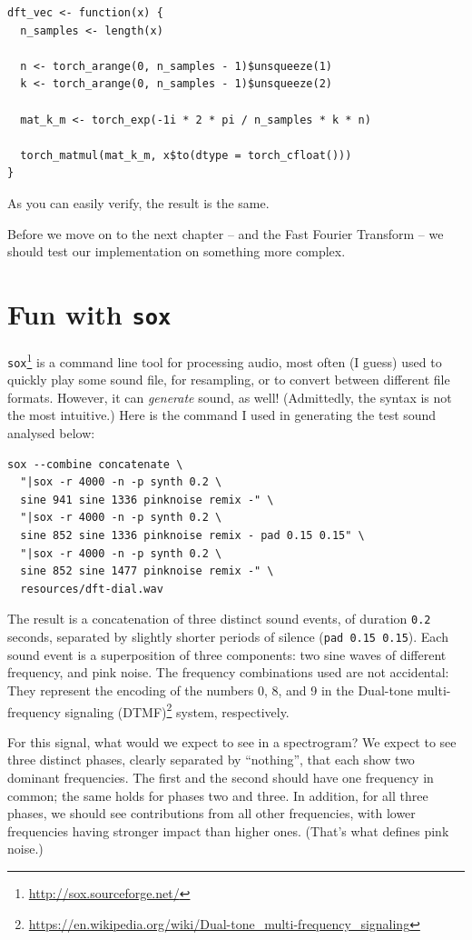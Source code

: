 \documentclass[
  letterpaper,
]{krantz}
\DeclareRobustCommand{\href}[2]{#2\footnote{\url{#1}}}
\begin{document}
\begin{verbatim}
dft_vec <- function(x) {
  n_samples <- length(x)

  n <- torch_arange(0, n_samples - 1)$unsqueeze(1)
  k <- torch_arange(0, n_samples - 1)$unsqueeze(2)

  mat_k_m <- torch_exp(-1i * 2 * pi / n_samples * k * n)

  torch_matmul(mat_k_m, x$to(dtype = torch_cfloat()))
}
\end{verbatim}

As you can easily verify, the result is the same.

Before we move on to the next chapter -- and the Fast Fourier Transform
-- we should test our implementation on something more complex.

\hypertarget{fun-with-sox}{%
\section{\texorpdfstring{Fun with
\texttt{sox}}{Fun with sox}}\label{fun-with-sox}}

\href{http://sox.sourceforge.net/}{\texttt{sox}} is a command line tool
for processing audio, most often (I guess) used to quickly play some
sound file, for resampling, or to convert between different file
formats. However, it can \emph{generate} sound, as well! (Admittedly,
the syntax is not the most intuitive.) Here is the command I used in
generating the test sound analysed below:

\begin{verbatim}
sox --combine concatenate \
  "|sox -r 4000 -n -p synth 0.2 \
  sine 941 sine 1336 pinknoise remix -" \
  "|sox -r 4000 -n -p synth 0.2 \
  sine 852 sine 1336 pinknoise remix - pad 0.15 0.15" \
  "|sox -r 4000 -n -p synth 0.2 \
  sine 852 sine 1477 pinknoise remix -" \
  resources/dft-dial.wav
\end{verbatim}

The result is a concatenation of three distinct sound events, of
duration \texttt{0.2} seconds, separated by slightly shorter periods of
silence (\texttt{pad\ 0.15\ 0.15}). Each sound event is a superposition
of three components: two sine waves of different frequency, and pink
noise. The frequency combinations used are not accidental: They
represent the encoding of the numbers 0, 8, and 9 in the
\href{https://en.wikipedia.org/wiki/Dual-tone_multi-frequency_signaling}{Dual-tone
multi-frequency signaling (DTMF)} system, respectively.

For this signal, what would we expect to see in a spectrogram? We expect
to see three distinct phases, clearly separated by ``nothing'', that
each show two dominant frequencies. The first and the second should have
one frequency in common; the same holds for phases two and three. In
addition, for all three phases, we should see contributions from all
other frequencies, with lower frequencies having stronger impact than
higher ones. (That's what defines pink noise.)
\end{document}
